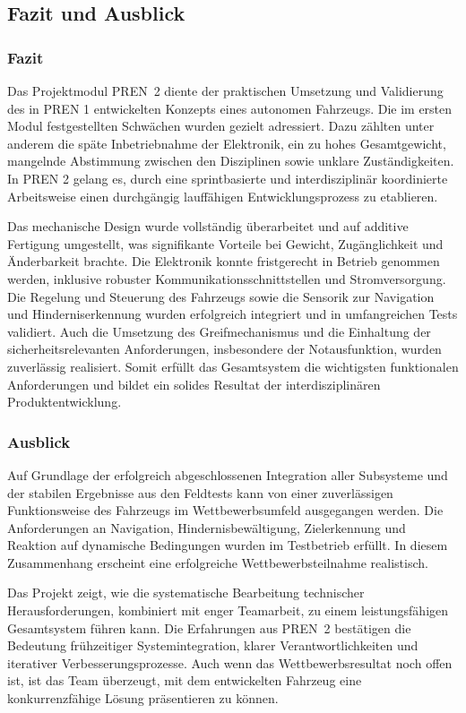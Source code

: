 \documentclass[main.tex]{subfiles} %
\begin{document}

\subsection{Fazit und Ausblick}

\subsubsection*{Fazit}
Das Projektmodul PREN~2 diente der praktischen Umsetzung und Validierung des in 
PREN 1 entwickelten Konzepts eines autonomen Fahrzeugs. Die im ersten Modul 
festgestellten Schwächen wurden gezielt adressiert. Dazu zählten unter anderem 
die späte Inbetriebnahme der Elektronik, ein zu hohes Gesamtgewicht, mangelnde 
Abstimmung zwischen den Disziplinen sowie unklare Zuständigkeiten. In PREN 2 
gelang es, durch eine sprintbasierte und interdisziplinär koordinierte 
Arbeitsweise einen durchgängig lauffähigen Entwicklungsprozess zu etablieren.

Das mechanische Design wurde vollständig überarbeitet und auf additive Fertigung 
umgestellt, was signifikante Vorteile bei Gewicht, Zugänglichkeit und Änderbarkeit 
brachte. Die Elektronik konnte fristgerecht in Betrieb genommen werden, inklusive 
robuster Kommunikationsschnittstellen und Stromversorgung. Die Regelung und 
Steuerung des Fahrzeugs sowie die Sensorik zur Navigation und Hinderniserkennung 
wurden erfolgreich integriert und in umfangreichen Tests validiert. Auch die 
Umsetzung des Greifmechanismus und die Einhaltung der sicherheitsrelevanten 
Anforderungen, insbesondere der Notausfunktion, wurden zuverlässig realisiert. 
Somit erfüllt das Gesamtsystem die wichtigsten funktionalen Anforderungen und 
bildet ein solides Resultat der interdisziplinären Produktentwicklung.

\subsubsection*{Ausblick}
Auf Grundlage der erfolgreich abgeschlossenen Integration aller Subsysteme und 
der stabilen Ergebnisse aus den Feldtests kann von einer zuverlässigen 
Funktionsweise des Fahrzeugs im Wettbewerbsumfeld ausgegangen werden. Die 
Anforderungen an Navigation, Hindernisbewältigung, Zielerkennung und Reaktion 
auf dynamische Bedingungen wurden im Testbetrieb erfüllt. In diesem Zusammenhang 
erscheint eine erfolgreiche Wettbewerbsteilnahme realistisch.

Das Projekt zeigt, wie die systematische Bearbeitung technischer 
Herausforderungen, kombiniert mit enger Teamarbeit, zu einem leistungsfähigen 
Gesamtsystem führen kann. Die Erfahrungen aus PREN~2 bestätigen die Bedeutung 
frühzeitiger Systemintegration, klarer Verantwortlichkeiten und iterativer 
Verbesserungsprozesse. Auch wenn das Wettbewerbsresultat noch offen ist, ist das 
Team überzeugt, mit dem entwickelten Fahrzeug eine konkurrenzfähige Lösung 
präsentieren zu können.
\end{document}
